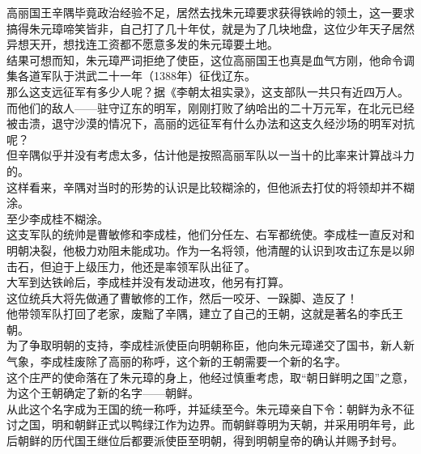 \begin{multicols}{\theparacolNo}
高丽国王辛隅毕竟政治经验不足，居然去找朱元璋要求获得铁岭的领土，这一要求搞得朱元璋啼笑皆非，自己打了几十年仗，就是为了几块地盘，这位少年天子居然异想天开，想找连工资都不愿意多发的朱元璋要土地。\\

结果可想而知，朱元璋严词拒绝了使臣，这位高丽国王也真是血气方刚，他命令调集各道军队于洪武二十一年（1388年）征伐辽东。\\

那么这支远征军有多少人呢？据《李朝太祖实录》，这支部队一共只有近四万人。而他们的敌人——驻守辽东的明军，刚刚打败了纳哈出的二十万元军，在北元已经被击溃，退守沙漠的情况下，高丽的远征军有什么办法和这支久经沙场的明军对抗呢？\\

但辛隅似乎并没有考虑太多，估计他是按照高丽军队以一当十的比率来计算战斗力的。\\

这样看来，辛隅对当时的形势的认识是比较糊涂的，但他派去打仗的将领却并不糊涂。\\

至少李成桂不糊涂。\\

这支军队的统帅是曹敏修和李成桂，他们分任左、右军都统使。李成桂一直反对和明朝决裂，他极力劝阻未能成功。作为一名将领，他清醒的认识到攻击辽东是以卵击石，但迫于上级压力，他还是率领军队出征了。\\

大军到达铁岭后，李成桂并没有发动进攻，他另有打算。\\

这位统兵大将先做通了曹敏修的工作，然后一咬牙、一跺脚、造反了！\\

他带领军队打回了老家，废黜了辛隅，建立了自己的王朝，这就是著名的李氏王朝。\\

为了争取明朝的支持，李成桂派使臣向明朝称臣，他向朱元璋递交了国书，新人新气象，李成桂废除了高丽的称呼，这个新的王朝需要一个新的名字。\\

这个庄严的使命落在了朱元璋的身上，他经过慎重考虑，取“朝日鲜明之国”之意，为这个王朝确定了新的名字——朝鲜。\\

从此这个名字成为王国的统一称呼，并延续至今。朱元璋亲自下令：朝鲜为永不征讨之国，明和朝鲜正式以鸭绿江作为边界。而朝鲜尊明为天朝，并采用明年号，此后朝鲜的历代国王继位后都要派使臣至明朝，得到明朝皇帝的确认并赐予封号。\\


\end{multicols}

